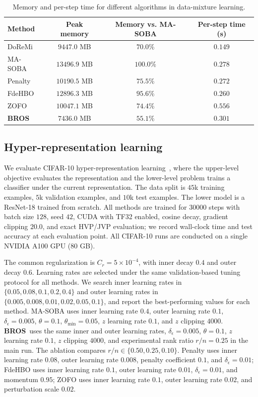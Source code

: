 \documentclass{pkumelon}
\theoremstyle{plain}
\newcommand{\oursname}{\textnormal{\textbf{BROS}}}
\newcommand{\ours}{\oursname\ }
\newcommand{\ourslast}{\oursname}
\begin{document}
\begin{table}[t!]
\centering
\caption{Memory and per-step time for different algorithms in data-mixture learning.}
\label{tab:data_mixture_memory}
\small
\setlength{\tabcolsep}{7pt}
\renewcommand{\arraystretch}{1.12}
\begin{tabular}{lccc}
\toprule
Method & Peak memory & Memory vs. MA-SOBA & Per-step time (s) \\
\midrule
DoReMi~\citep{xie2023doremi} & $9447.0$ MB & $70.0\%$ & $0.149$ \\
MA-SOBA~\citep{chen2024optimal} & $13496.9$ MB & $100.0\%$ & $0.278$ \\
Penalty~\citep{mehra2021penalty} & $10190.5$ MB & $75.5\%$ & $0.272$ \\
FdeHBO~\citep{yang2023achieving} & $12896.3$ MB & $95.6\%$ & $0.260$ \\
ZOFO~\citep{shirkavand2025bilevel} & $10047.1$ MB & $74.4\%$ & $0.556$ \\
\rowcolor{boxbg}
\ourslast & $7436.0$ MB & $55.1\%$ & $0.301$ \\
\bottomrule
\end{tabular}
\end{table}

\subsection{Hyper-representation learning}
We evaluate CIFAR-10 hyper-representation learning~\citep{krizhevsky2009learning}, where the upper-level objective evaluates the representation and the lower-level problem trains a classifier under the current representation. The data split is $45$k training examples, $5$k validation examples, and $10$k test examples. The lower model is a ResNet-18 trained from scratch. All methods are trained for $30000$ steps with batch size $128$, seed $42$, CUDA with TF32 enabled, cosine decay, gradient clipping $20.0$, and exact HVP/JVP evaluation; we record wall-clock time and test accuracy at each evaluation point.
All CIFAR-10 runs are conducted on a single NVIDIA A100 GPU ($80$ GB).

The common regularization is $C_r=5\times10^{-4}$, with inner decay $0.4$ and outer decay $0.6$. Learning rates are selected under the same validation-based tuning protocol for all methods. We search inner learning rates in $\{0.05,0.08,0.1,0.2,0.4\}$ and outer learning rates in $\{0.005,0.008,0.01,0.02,0.05,0.1\}$, and report the best-performing values for each method. MA-SOBA uses inner learning rate $0.4$, outer learning rate $0.1$, $\delta_{\epsilon}=0.005$, $\theta=0.1$, $\theta_{\min}=0.05$, $z$ learning rate $0.1$, and $z$ clipping $4000$. \ours uses the same inner and outer learning rates, $\delta_{\epsilon}=0.005$, $\theta=0.1$, $z$ learning rate $0.1$, $z$ clipping $4000$, and experimental rank ratio $r/n=0.25$ in the main run. The ablation compares $r/n\in\{0.50,0.25,0.10\}$. Penalty uses inner learning rate $0.08$, outer learning rate $0.008$, penalty coefficient $0.1$, and $\delta_{\epsilon}=0.01$; FdeHBO uses inner learning rate $0.1$, outer learning rate $0.01$, $\delta_{\epsilon}=0.01$, and momentum $0.95$; ZOFO uses inner learning rate $0.1$, outer learning rate $0.02$, and perturbation scale $0.02$.
\end{document}

